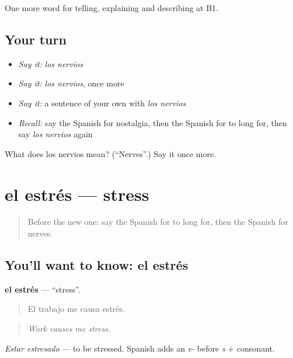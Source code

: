 \begin{grammarlens}[title={What you've built}]
One more word for telling, explaining and describing at B1.
\end{grammarlens}

\subsection*{Your turn}
\begin{itemize}
\raggedright
  \item \emph{Say it:} \emph{los nervios}
  \item \emph{Say it:} \emph{los nervios}, once more
  \item \emph{Say it:} a sentence of your own with \emph{los nervios}
  \item \emph{Recall:} say the Spanish for nostalgia, then the Spanish for to long for, then say \emph{los nervios} again
\end{itemize}

\begin{tcolorbox}[breakable,colback=teal!4,colframe=teal!35!black,title={Before you move on}]
What does los nervios mean? (\textquotedblleft{}Nerves\textquotedblright{}.) Say it once more.
\end{tcolorbox}
\section[el estrés]{el estrés — stress}

\label{lesson:ES-C710-estres}



\begin{quote}
Before the new one: say the Spanish for to long for, then the Spanish for nerves.
\end{quote}

\subsection*{You'll want to know: el estrés}
\textbf{el estrés} — \textquotedblleft{}stress\textquotedblright{}.

\begin{quote}
El trabajo me causa estrés.
\end{quote}

\begin{quote}
\emph{Work causes me stress.}
\end{quote}

\emph{Estar estresado} — to be stressed. Spanish adds an \emph{e-} before \emph{s} + consonant.

